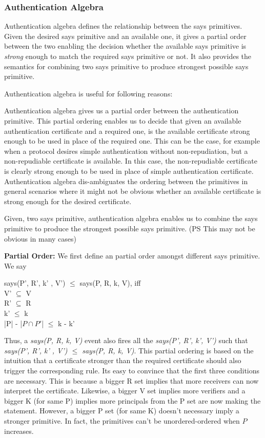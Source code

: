 \subsubsection{Authentication Algebra}

Authentication algebra defines the relationship between the says primitives. Given the desired says primitive and an available one, it gives a partial order between the two enabling the decision whether the available says primitive is {\em strong} enough to match the required says primitive or not. It also provides the semantics for combining two says primitive to produce strongest possible says primitive.

Authentication algebra is useful for following reasons:
\be
\item Authentication algebra gives us a partial order between the authentication primitive. This partial ordering enables us to decide that given an available authentication certificate and a required one, is the available certificate strong enough to be used in place of the required one. This can be the case, for example when a protocol desires simple authentication without non-repudiation, but a non-repudiable certificate is available. In this case, the non-repudiable certificate is clearly strong enough to be used in place of simple authentication certificate. Authentication algebra dis-ambiguates the ordering between the primitives in general scenarios where it might not be obvious whether an available certificate is strong enough for the desired certificate.
\item Given, two says primitive, authentication algebra enables us to combine the says primitive to produce the strongest possible says primitive. (PS This may not be obvious in many cases)
\ee

{\bf Partial Order:} We first define an partial order amongst different says primitive. We say

\begin{center}
says(P', R', k' , V') $\leq$ says(P, R, k, V), iff\\
V' $\subseteq$ V\\
R' $\subseteq$ R\\
k' $\leq$ k\\
|P| - |$P \cap P'$| $\leq$ k - k'
\end{center}

Thus, a {\em says(P, R, k, V)} event also fires all the {\em says(P', R', k', V')} such that {\em says(P', R', k' , V') $\leq$ says(P, R, k, V)}. This partial ordering is based on the intuition that a certificate stronger than the required certificate should also trigger the corresponding rule. Its easy to convince that the first three conditions are necessary. This is because a bigger R set implies that more receivers can now interpret the certificate. Likewise, a bigger V set implies more verifiers and a bigger K (for same P) implies more principals from the P set are now making the statement. However, a bigger P set (for same K) doesn't necessary imply a stronger primitive. In fact, the primitives can't be unordered-ordered when $P$ increases. 

